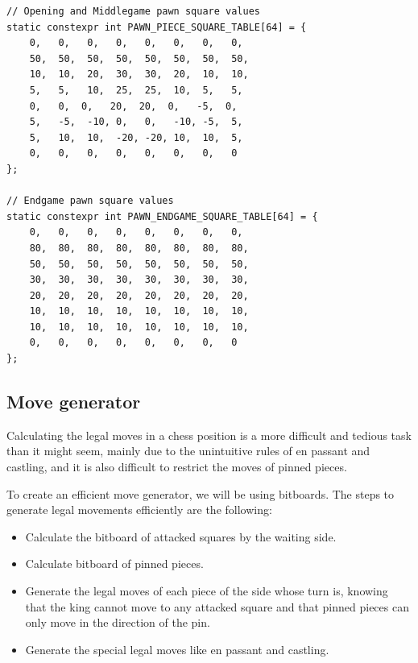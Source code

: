 \begin{lstlisting}[breaklines=true, frame=single, caption={Different pawn square values depending on game phase.}]
// Opening and Middlegame pawn square values
static constexpr int PAWN_PIECE_SQUARE_TABLE[64] = {
    0,   0,   0,   0,   0,   0,   0,   0,
    50,  50,  50,  50,  50,  50,  50,  50,
    10,  10,  20,  30,  30,  20,  10,  10,
    5,   5,   10,  25,  25,  10,  5,   5,
    0,   0,  0,   20,  20,  0,   -5,  0,
    5,   -5,  -10, 0,   0,   -10, -5,  5,
    5,   10,  10,  -20, -20, 10,  10,  5,
    0,   0,   0,   0,   0,   0,   0,   0
};

// Endgame pawn square values
static constexpr int PAWN_ENDGAME_SQUARE_TABLE[64] = {
    0,   0,   0,   0,   0,   0,   0,   0,
    80,  80,  80,  80,  80,  80,  80,  80,
    50,  50,  50,  50,  50,  50,  50,  50,
    30,  30,  30,  30,  30,  30,  30,  30,
    20,  20,  20,  20,  20,  20,  20,  20,
    10,  10,  10,  10,  10,  10,  10,  10,
    10,  10,  10,  10,  10,  10,  10,  10,
    0,   0,   0,   0,   0,   0,   0,   0
};
\end{lstlisting}

\subsection{Move generator}

Calculating the legal moves in a chess position is a more difficult and tedious task than it might seem, mainly due to the unintuitive rules of en passant and castling, and it is also difficult to restrict the moves of pinned pieces.~\cite{GenerateLegalMovesEfficiently}

\vspace{1em}

\noindent To create an efficient move generator, we will be using bitboards. The steps to generate legal movements efficiently are the following:

\begin{itemize}
  \item Calculate the bitboard of attacked squares by the waiting side.
  \item Calculate bitboard of pinned pieces.
  \item Generate the legal moves of each piece of the side whose turn is, knowing that the king cannot move to any attacked square and that pinned pieces can only move in the direction of the pin.
  \item Generate the special legal moves like en passant and castling.
\end{itemize}

